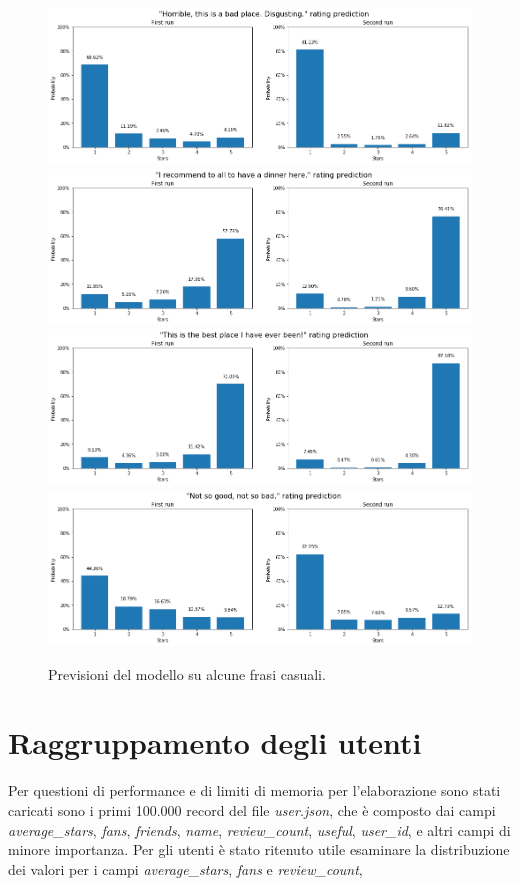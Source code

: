 \documentclass[12pt]{article}
\begin{document}
\begin{figure}[H]
\centering
\includegraphics[width=\textwidth]{images/sent1.png}
\includegraphics[width=\textwidth]{images/sent2.png}
\includegraphics[width=\textwidth]{images/sent3.png}
\includegraphics[width=\textwidth]{images/sent4.png}
\caption{Previsioni del modello su alcune frasi casuali.}
\end{figure}

\section{Raggruppamento degli utenti}
\label{sec:users}
Per questioni di performance e di limiti di memoria per l'elaborazione sono stati caricati sono i primi 100.000 record del file \textit{user.json}, che è composto dai campi \textit{average\_stars}, \textit{fans}, \textit{friends}, \textit{name}, \textit{review\_count}, \textit{useful}, \textit{user\_id}, e altri campi di minore importanza. \newline
Per gli utenti è stato ritenuto utile esaminare la distribuzione dei valori per i campi \textit{average\_stars}, \textit{fans} e \textit{review\_count},
\end{document}
